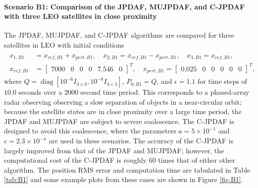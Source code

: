 \documentclass[letterpaper, paper,10pt]{AAS}		%
\newcommand{\diag}{\mathop{\mathrm{diag}}\nolimits}
\begin{document}
\paragraph*{Scenario B1: Comparison of the JPDAF, MUJPDAF, and C-JPDAF with three LEO satellites in close proximity}
The JPDAF, MUJPDAF, and C-JPDAF algorithms are compared for three satellites in LEO with initial conditions
\begin{align}
\begin{split}
x_{1,B1}&=x_{ref,B1}+x_{pert,B1}, \quad x_{2,B1}=x_{ref,B1}-x_{pert,B1}, \quad x_{3,B1}=x_{ref,B1},
\\
x_{ref,B1}&=\begin{bmatrix}7000 & 0 & 0 & 0 & 7.546 & 0\end{bmatrix}^T, \quad x_{pert,B1}=\begin{bmatrix}
0.025 & 0 & 0 & 0 & 0 & 0
\end{bmatrix}^T,
\end{split}
\end{align}
where $Q=\diag[10^{-6}I_{3\times3}, 10^{-8}I_{3\times3}]$, $P_{0,B1}=Q$, and $\epsilon=1.1$ for time steps of $10.0$ seconds over a $2000$ second time period.
This corresponds to a phased-array radar observing observing a slow separation of objects in a near-circular orbit; because the satellite states are in close proximity over a large time period, the JPDAF and MUJPDAF are subject to severe coalescence.
The C-JPDAF is designed to avoid this coalescence, where the parameters $a=5\times10^{-1}$ and $c=2.3\times10^{-4}$ are used in these scenarios.
The accuracy of the C-JPDAF is largely improved from that of the JPDAF and MUJPDAF; however, the computational cost of the C-JPDAF is roughly $60$ times that of either other algorithm.
The position RMS error and computation time are tabulated in Table \ref{tab:B1} and some example plots from these cases are shown in Figure \ref{fig:B1}.
\end{document}

